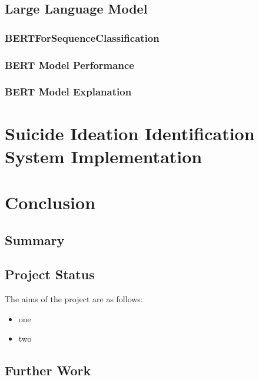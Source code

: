 \documentclass[ %
                    author={Louis Wang},
                supervisor={Dr. Qiang Liu},
                    degree={MSc},
                     title={Identification of Suicide Ideation in Texts},
                      type={},
                      year={2024}]{dissertation}
\begin{document}
\section{Large Language Model}

\subsection{BERTForSequenceClassification}

\subsection{BERT Model Performance}

\subsection{BERT Model Explanation}


\chapter{Suicide Ideation Identification System Implementation}
\label{chap:implementation}


\chapter{Conclusion}
\label{chap:conclusion}

\section{Summary}

\noindent

\section{Project Status}

\noindent
The aims of the project are as follows:

\begin{itemize}
      \item one
      \item two
\end{itemize}

\section{Further Work}
\end{document}
